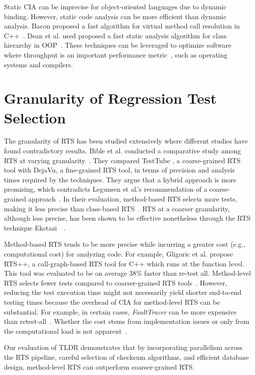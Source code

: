 Static CIA can be imprecise for object-oriented languages due to dynamic binding. However, static code analysis can be more efficient than dynamic analysis. Bacon proposed a fast algorithm for virtual method call resolution in C++~\cite{bacon1996fast}. Dean et al. used proposed a fast static analysis algorithm for class hierarchy in OOP~\cite{dean1995optimization}. These techniques can be leveraged to optimize software where throughput is an important performance metric~\cite{chambers1996whole}, such as operating systems and compilers.

\section{Granularity of Regression Test Selection}
The granularity of RTS has been studied extensively where different studies have found contradictory results. Bible et al. conducted a comparative study among RTS at varying granularity~\cite{biblecompare}. They compared TestTube \cite{b40}, a coarse-grained RTS tool with DejaVu, a fine-grained RTS tool, in terms of precision and analysis times required by the techniques. They argue that a hybrid approach is more promising, which contradicts Legunsen et al.'s recommendation of a coarse-grained approach~\cite{b37}. In their evaluation, method-based RTS selects more tests, making it less precise than class-based RTS~\cite{b37}. RTS at a coarser granularity, although less precise, has been shown to be effective nonetheless through the RTS technique Ekstazi~\cite{ekstazi}~\cite{ekstazi}. 

Method-based RTS tends to be more precise while incurring a greater cost (e.g., computational cost) for analyzing code. For example, Gligoric et al. propose RTS++, a call-graph-based RTS tool for C++ which runs at the function level. This tool was evaluated to be on average 38\% faster than re-test all. Method-level RTS selects fewer tests compared to coarser-grained RTS tools~\cite{faulttracer, hyrts, rtsplusplus}. However, reducing the test execution time might not necessarily yield shorter end-to-end testing times because the overhead of CIA for method-level RTS can be substantial. For example, in certain cases, \textit{FaultTracer} can be more expensive than retest-all~\cite{faulttracer}. Whether the cost stems from implementation issues or only from the computational load is not apparent~\cite{faulttracer}. 

Our evaluation of TLDR demonstrates that by incorporating parallelism  across the RTS pipeline, careful selection of checksum algorithms, and efficient database design, method-level RTS can outperform coarser-grained RTS.

